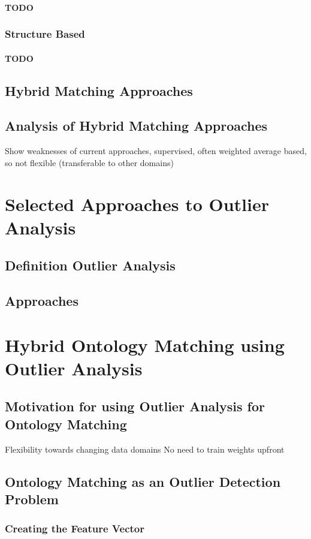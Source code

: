 \documentclass[11pt,titlepage,oneside,openany,a4paper]{report}
\begin{document}
 \subsubsection{TODO}
\subsection{Structure Based}
 \subsubsection{TODO}
\section{Hybrid Matching Approaches}
\section{Analysis of Hybrid Matching Approaches}
Show weaknesses of current approaches, supervised, often weighted average based, so not flexible (transferable to other domains)

\chapter{Selected Approaches to Outlier Analysis}
\section{Definition Outlier Analysis}
\section{Approaches}


\chapter{Hybrid Ontology Matching using Outlier Analysis}
\section{Motivation for using Outlier Analysis for Ontology Matching}
Flexibility towards changing data domains
No need to train weights upfront
\section{Ontology Matching as an Outlier Detection Problem}
\subsection{Creating the Feature Vector}
\end{document}
